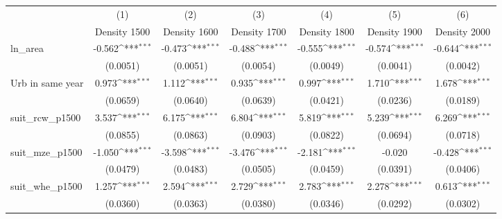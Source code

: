 {
\def\sym#1{\ifmmode^{#1}\else\(^{#1}\)\fi}
\begin{tabular}{l*{6}{c}}
\toprule
                    &\multicolumn{1}{c}{(1)}&\multicolumn{1}{c}{(2)}&\multicolumn{1}{c}{(3)}&\multicolumn{1}{c}{(4)}&\multicolumn{1}{c}{(5)}&\multicolumn{1}{c}{(6)}\\
                    &\multicolumn{1}{c}{Density 1500}&\multicolumn{1}{c}{Density 1600}&\multicolumn{1}{c}{Density 1700}&\multicolumn{1}{c}{Density 1800}&\multicolumn{1}{c}{Density 1900}&\multicolumn{1}{c}{Density 2000}\\
\midrule
ln\_area             &      -0.562\sym{***}&      -0.473\sym{***}&      -0.488\sym{***}&      -0.555\sym{***}&      -0.574\sym{***}&      -0.644\sym{***}\\
                    &    (0.0051)         &    (0.0051)         &    (0.0054)         &    (0.0049)         &    (0.0041)         &    (0.0042)         \\
\addlinespace
Urb in same year    &       0.973\sym{***}&       1.112\sym{***}&       0.935\sym{***}&       0.997\sym{***}&       1.710\sym{***}&       1.678\sym{***}\\
                    &    (0.0659)         &    (0.0640)         &    (0.0639)         &    (0.0421)         &    (0.0236)         &    (0.0189)         \\
\addlinespace
suit\_rcw\_p1500      &       3.537\sym{***}&       6.175\sym{***}&       6.804\sym{***}&       5.819\sym{***}&       5.239\sym{***}&       6.269\sym{***}\\
                    &    (0.0855)         &    (0.0863)         &    (0.0903)         &    (0.0822)         &    (0.0694)         &    (0.0718)         \\
\addlinespace
suit\_mze\_p1500      &      -1.050\sym{***}&      -3.598\sym{***}&      -3.476\sym{***}&      -2.181\sym{***}&      -0.020         &      -0.428\sym{***}\\
                    &    (0.0479)         &    (0.0483)         &    (0.0505)         &    (0.0459)         &    (0.0391)         &    (0.0406)         \\
\addlinespace
suit\_whe\_p1500      &       1.257\sym{***}&       2.594\sym{***}&       2.729\sym{***}&       2.783\sym{***}&       2.278\sym{***}&       0.613\sym{***}\\
                    &    (0.0360)         &    (0.0363)         &    (0.0380)         &    (0.0346)         &    (0.0292)         &    (0.0302)         \\

\end{tabular}}
